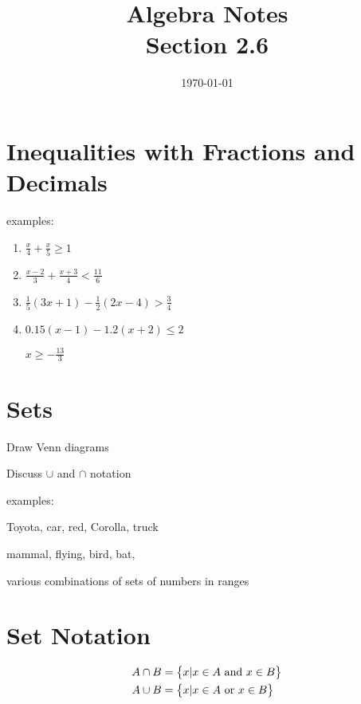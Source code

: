 \documentclass[letterpaper, landscape]{exam}
\title{Algebra Notes \\ Section 2.6 }
\author{}
\date{\today}
\begin{document}
  \maketitle

  \section{Inequalities with Fractions and Decimals}

  examples:
  \begin{enumerate}

    \item $\frac{x}{4} + \frac{x}{5} \geq 1$

    \item $\frac{x - 2}{3} + \frac{x + 3}{4} < \frac{11}{6}$

    \item $\frac{1}{5} (3x + 1) - \frac{1}{2} (2x - 4) > \frac{3}{4}$

    \item $0.15 (x - 1) - 1.2 (x + 2) \leq 2$
      \begin{solution}
        $x \geq -\frac{13}{3}$
      \end{solution}

  \end{enumerate}

  \section{Sets}

  \begin{itemize*}
    \item Draw Venn diagrams
    \item Discuss $\cup$ and $\cap$ notation
  \end{itemize*}

  examples:
  \begin{itemize*}
    \item Toyota, car, red, Corolla, truck
    \item mammal, flying, bird, bat, 
    \item various combinations of sets of numbers in ranges
  \end{itemize*}

  \section{Set Notation}
  
  \begin{align*}
    A \cap B &= \cbr{x | x \in A \text{ and } x \in B} \\
    A \cup B &= \cbr{x | x \in A \text{ or } x \in B} \\
  \end{align*}
  
\end{document}
